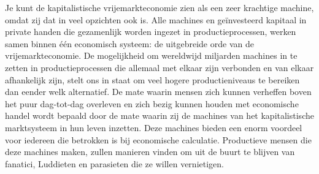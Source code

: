 \documentclass[
  a5paper,
  smalldemyvopaper,11pt,twoside,onecolumn,openright,extrafontsizes,
hidelinks]{memoir}
\begin{document}
Je kunt de kapitalistische vrijemarkteconomie zien als een zeer
krachtige machine, omdat zij dat in veel opzichten ook is. Alle machines
en geïnvesteerd kapitaal in private handen die gezamenlijk worden
ingezet in productieprocessen, werken samen binnen één economisch
systeem: de uitgebreide orde van de vrijemarkteconomie. De mogelijkheid
om wereldwijd miljarden machines in te zetten in productieprocessen die
allemaal met elkaar zijn verbonden en van elkaar afhankelijk zijn, stelt
ons in staat om veel hogere productieniveaus te bereiken dan eender welk
alternatief. De mate waarin mensen zich kunnen verheffen boven het puur
dag-tot-dag overleven en zich bezig kunnen houden met economische handel
wordt bepaald door de mate waarin zij de machines van het
kapitalistische marktsysteem in hun leven inzetten. Deze machines bieden
een enorm voordeel voor iedereen die betrokken is bij economische
calculatie. Productieve mensen die deze machines maken, zullen manieren
vinden om uit de buurt te blijven van fanatici, Luddieten en parasieten
die ze willen vernietigen.
\end{document}
